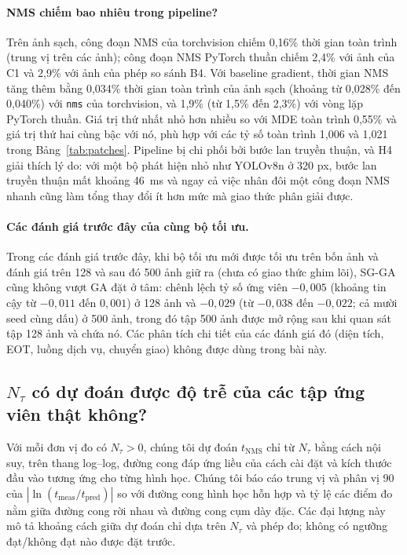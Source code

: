 \documentclass[a4paper,fleqn]{cas-dc}
\newcommand{\Ntau}{N_{\tau}}
\begin{document}
\paragraph{NMS chiếm bao nhiêu trong pipeline?}
Trên ảnh sạch, công đoạn NMS của torchvision chiếm 0,16\% thời gian toàn trình (trung vị trên các ảnh); công đoạn NMS PyTorch thuần chiếm 2,4\% với ảnh của C1 và 2,9\% với ảnh của phép so sánh B4. Với baseline gradient, thời gian NMS tăng thêm bằng 0,034\% thời gian toàn trình của ảnh sạch (khoảng từ 0,028\% đến 0,040\%) với \texttt{nms} của torchvision, và 1,9\% (từ 1,5\% đến 2,3\%) với vòng lặp PyTorch thuần. Giá trị thứ nhất nhỏ hơn nhiều so với MDE toàn trình 0,55\% và giá trị thứ hai cùng bậc với nó, phù hợp với các tỷ số toàn trình 1,006 và 1,021 trong Bảng~\ref{tab:patches}. Pipeline bị chi phối bởi bước lan truyền thuận, và H4 giải thích lý do: với một bộ phát hiện nhỏ như YOLOv8n ở 320 px, bước lan truyền thuận mất khoảng 46~ms và ngay cả việc nhân đôi một công đoạn NMS nhanh cũng làm tổng thay đổi ít hơn mức mà giao thức phân giải được.

\paragraph{Các đánh giá trước đây của cùng bộ tối ưu.}
Trong các đánh giá trước đây, khi bộ tối ưu mới được tối ưu trên bốn ảnh và đánh giá trên 128 và sau đó 500 ảnh giữ ra (chưa có giao thức ghim lõi), SG-GA cũng không vượt GA đặt ở tâm: chênh lệch tỷ số ứng viên $-0{,}005$ (khoảng tin cậy từ $-0{,}011$ đến $0{,}001$) ở 128 ảnh và $-0{,}029$ (từ $-0{,}038$ đến $-0{,}022$; cả mười seed cùng dấu) ở 500 ảnh, trong đó tập 500 ảnh được mở rộng sau khi quan sát tập 128 ảnh và chứa nó. Các phân tích chi tiết của các đánh giá đó (diện tích, EOT, luồng dịch vụ, chuyển giao) không được dùng trong bài này.

\subsection{$\Ntau$ có dự đoán được độ trễ của các tập ứng viên thật không?}
Với mỗi đơn vị đo có $\Ntau>0$, chúng tôi dự đoán $t_{\mathrm{NMS}}$ chỉ từ $\Ntau$ bằng cách nội suy, trên thang log--log, đường cong đáp ứng liều của cách cài đặt và kích thước đầu vào tương ứng cho từng hình học. Chúng tôi báo cáo trung vị và phân vị 90 của $|\ln(t_{\mathrm{meas}}/t_{\mathrm{pred}})|$ so với đường cong hình học hỗn hợp và tỷ lệ các điểm đo nằm giữa đường cong rời nhau và đường cong cụm dày đặc. Các đại lượng này mô tả khoảng cách giữa dự đoán chỉ dựa trên $\Ntau$ và phép đo; không có ngưỡng đạt/không đạt nào được đặt trước.
\end{document}
